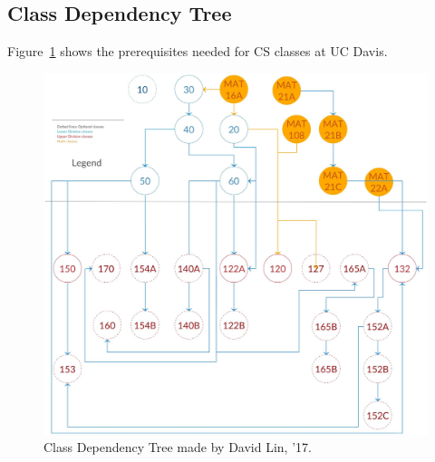 \documentclass{article}
\begin{document}
\subsection{Class Dependency Tree}
Figure~\ref{fig:deps} shows the prerequisites needed for CS classes at UC Davis.
\begin{figure}[htbp]
  \includegraphics[width=\linewidth]{classdep.jpg}
  \caption{Class Dependency Tree made by David Lin, '17.\label{fig:deps}}
\end{figure}
\newpage
\end{document}
